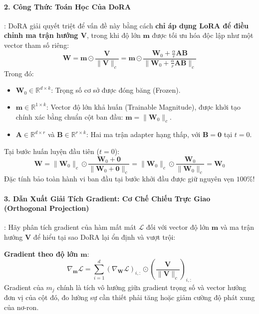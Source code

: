 \paragraph{2. Công Thức Toán Học Của DoRA}:
DoRA giải quyết triệt để vấn đề này bằng cách \textbf{chỉ áp dụng LoRA để điều chỉnh ma trận hướng $\mathbf{V}$}, trong khi độ lớn $\mathbf{m}$ được tối ưu hóa độc lập như một vector tham số riêng:
\begin{equation}
\label{eq:dora-forward-formulation}
\mathbf{W} = \mathbf{m} \odot \frac{\mathbf{V}}{\|\mathbf{V}\|_c} = \mathbf{m} \odot \frac{\mathbf{W}_0 + \frac{\alpha}{r} \mathbf{A} \mathbf{B}}{\|\mathbf{W}_0 + \frac{\alpha}{r} \mathbf{A} \mathbf{B}\|_c}
\end{equation}
Trong đó:
\begin{itemize}
  \item $\mathbf{W}_0 \in \mathbb{R}^{d \times k}$: Trọng số cơ sở được đóng băng (Frozen).
  \item $\mathbf{m} \in \mathbb{R}^{1 \times k}$: Vector độ lớn khả huấn (Trainable Magnitude), được khởi tạo chính xác bằng chuẩn cột ban đầu: $\mathbf{m} = \|\mathbf{W}_0\|_c$.
  \item $\mathbf{A} \in \mathbb{R}^{d \times r}$ và $\mathbf{B} \in \mathbb{R}^{r \times k}$: Hai ma trận adapter hạng thấp, với $\mathbf{B} = \mathbf{0}$ tại $t=0$.
\end{itemize}
Tại bước huấn luyện đầu tiên ($t=0$):
\begin{equation}
\mathbf{W} = \|\mathbf{W}_0\|_c \odot \frac{\mathbf{W}_0 + \mathbf{0}}{\|\mathbf{W}_0 + \mathbf{0}\|_c} = \|\mathbf{W}_0\|_c \odot \frac{\mathbf{W}_0}{\|\mathbf{W}_0\|_c} = \mathbf{W}_0
\end{equation}
Đặc tính bảo toàn hành vi ban đầu tại bước khởi đầu được giữ nguyên vẹn $100\%$!

\paragraph{3. Dẫn Xuất Giải Tích Gradient: Cơ Chế Chiếu Trực Giao (Orthogonal Projection)}:
Hãy phân tích gradient của hàm mất mát $\mathcal{L}$ đối với vector độ lớn $\mathbf{m}$ và ma trận hướng $\mathbf{V}$ để hiểu tại sao DoRA lại ổn định và vượt trội:

\textbf{Gradient theo độ lớn $\mathbf{m}$}:
\begin{equation}
\nabla_{\mathbf{m}} \mathcal{L} = \sum_{i=1}^d \left( \nabla_{\mathbf{W}} \mathcal{L} \right)_{i, :} \odot \left( \frac{\mathbf{V}}{\|\mathbf{V}\|_c} \right)_{i, :}
\end{equation}
Gradient của $m_j$ chính là tích vô hướng giữa gradient trọng số và vector hướng đơn vị của cột đó, đo lường sự cần thiết phải tăng hoặc giảm cường độ phát xung của nơ-ron.

